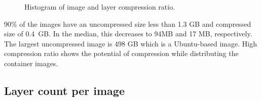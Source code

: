 \begin{figure}[!t]
	\centering
	\caption{Histogram of image and layer compression ratio.}
	\label{fig:reference-cnt}
\end{figure}

90\% of the images have an uncompressed size less than 1.3 GB and compressed size of 0.4~GB.
In the median, this decreases to 94MB and 17 MB, respectively.
The largest uncompressed image is 498 GB which is a Ubuntu-based image.
High compression ratio shows the potential of compression while distributing the container images.


\subsection{Layer count per image}

